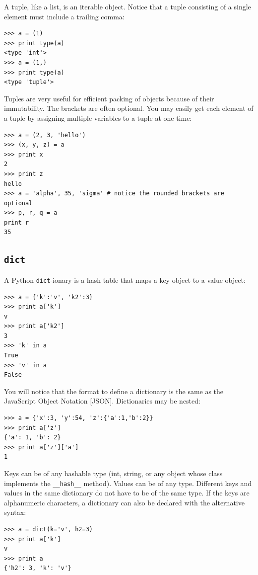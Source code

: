 \documentclass[justified,sixbynine]{tufte-book}
\def\ft{\small\tt}
\theoremstyle{plain}%
\theoremstyle{definition}
\theoremstyle{remark}
\begin{document}
\begin{fullwidth}
A tuple, like a list, is an iterable object. Notice that a tuple consisting of a single element must include a trailing comma:
\begin{lstlisting}
>>> a = (1)
>>> print type(a)
<type 'int'>
>>> a = (1,)
>>> print type(a)
<type 'tuple'>
\end{lstlisting}

Tuples are very useful for efficient packing of objects because of their immutability. The brackets are often optional.  You may easily get each element of a tuple by assigning multiple variables to a tuple at one time:
\begin{lstlisting}
>>> a = (2, 3, 'hello')
>>> (x, y, z) = a
>>> print x
2
>>> print z
hello
>>> a = 'alpha', 35, 'sigma' # notice the rounded brackets are optional
>>> p, r, q = a
print r
35
\end{lstlisting}

\goodbreak\subsection{{\ft dict}}


A Python {\ft dict}-ionary is a hash table that maps a key object to a value object:
\begin{lstlisting}
>>> a = {'k':'v', 'k2':3}
>>> print a['k']
v
>>> print a['k2']
3
>>> 'k' in a
True
>>> 'v' in a
False
\end{lstlisting}

You will notice that the format to define a dictionary is the same as the JavaScript Object Notation [JSON].  Dictionaries may be nested:
\begin{lstlisting}
>>> a = {'x':3, 'y':54, 'z':{'a':1,'b':2}}
>>> print a['z']
{'a': 1, 'b': 2}
>>> print a['z']['a']
1
\end{lstlisting}

Keys can be of any hashable type (int, string, or any object whose class implements the {\ft \_\_hash\_\_} method). Values can be of any type. Different keys and values in the same dictionary do not have to be of the same type. If the keys are alphanumeric characters, a dictionary can also be declared with the alternative syntax:
\begin{lstlisting}
>>> a = dict(k='v', h2=3)
>>> print a['k']
v
>>> print a
{'h2': 3, 'k': 'v'}
\end{lstlisting}


\end{fullwidth}
\end{document}
